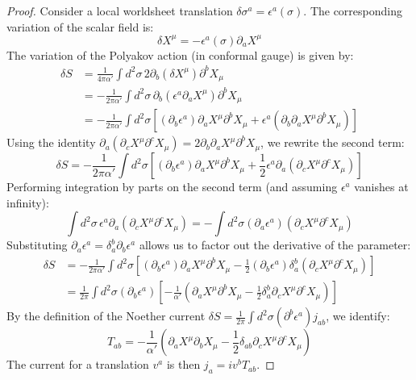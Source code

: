  \begin{tcolorbox}[breakable]
\begin{proof}
	Consider a local worldsheet translation $\delta \sigma^{a} = \epsilon^{a}(\sigma)$. The corresponding variation of the scalar field is:
	$$ \delta X^{\mu} = -\epsilon^{a}(\sigma) \partial_{a} X^{\mu} $$
	The variation of the Polyakov action (in conformal gauge) is given by:
	\begin{align*}
		\delta S &= \frac{1}{4\pi \alpha'} \int d^{2} \sigma \, 2\partial_{b} (\delta X^{\mu}) \partial^{b} X_{\mu} \\
		&= -\frac{1}{2\pi \alpha'} \int d^{2} \sigma \, \partial_{b} (\epsilon^{a} \partial_{a} X^{\mu}) \partial^{b} X_{\mu} \\
		&= -\frac{1}{2\pi \alpha'} \int d^{2} \sigma \left[ (\partial_{b} \epsilon^{a}) \partial_{a} X^{\mu} \partial^{b} X_{\mu} + \epsilon^{a} (\partial_{b} \partial_{a} X^{\mu} \partial^{b} X_{\mu}) \right]
	\end{align*}
	Using the identity $\partial_{a} (\partial_{c} X^{\mu} \partial^{c} X_{\mu}) = 2 \partial_{b} \partial_{a} X^{\mu} \partial^{b} X_{\mu}$, we rewrite the second term:
	$$ \delta S = -\frac{1}{2\pi \alpha'} \int d^{2} \sigma \left[ (\partial_{b} \epsilon^{a}) \partial_{a} X^{\mu} \partial^{b} X_{\mu} + \frac{1}{2} \epsilon^{a} \partial_{a} (\partial_{c} X^{\mu} \partial^{c} X_{\mu}) \right] $$
	Performing integration by parts on the second term (and assuming $\epsilon^a$ vanishes at infinity):
	$$ \int d^{2} \sigma \, \epsilon^{a} \partial_{a} (\partial_{c} X^{\mu} \partial^{c} X_{\mu}) = - \int d^{2} \sigma (\partial_{a} \epsilon^{a}) (\partial_{c} X^{\mu} \partial^{c} X_{\mu}) $$
	Substituting $\partial_{a} \epsilon^{a} = \delta^{b}_{a} \partial_{b} \epsilon^{a}$ allows us to factor out the derivative of the parameter:
	\begin{align*}
		\delta S &= -\frac{1}{2\pi \alpha'} \int d^{2} \sigma \left[ (\partial_{b} \epsilon^{a}) \partial_{a} X^{\mu} \partial^{b} X_{\mu} - \frac{1}{2} (\partial_{b} \epsilon^{a}) \delta^{b}_{a} (\partial_{c} X^{\mu} \partial^{c} X_{\mu}) \right] \\
		&= \frac{1}{2\pi} \int d^{2} \sigma (\partial_{b} \epsilon^{a}) \left[ -\frac{1}{\alpha'} \left( \partial_{a} X^{\mu} \partial^{b} X_{\mu} - \frac{1}{2} \delta^{b}_{a} \partial_{c} X^{\mu} \partial^{c} X_{\mu} \right) \right]
	\end{align*}
	By the definition of the Noether current $\delta S = \frac{1}{2\pi} \int d^2\sigma (\partial^b \epsilon^a) j_{ab}$, we identify:
	$$ T_{ab} = -\frac{1}{\alpha'} \left( \partial_{a} X^{\mu} \partial_{b} X_{\mu} - \frac{1}{2} \delta_{ab} \partial_{c} X^{\mu} \partial^{c} X_{\mu} \right) $$
	The current for a translation $v^a$ is then $j_a = iv^b T_{ab}$.
\end{proof}
 \end{tcolorbox}


